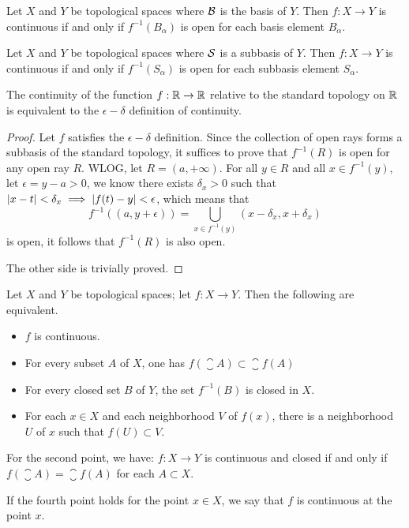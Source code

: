 \documentclass[12pt,a4paper]{article}
\begin{document}
    \begin{thm}
        Let $X$ and $Y$ be topological spaces where $\B$ is the basis of $Y$. Then $f:X\to Y$ is continuous if and only if $f^{-1}(B_\alpha)$ is open for each basis element $B_\alpha$.
    \end{thm}
    \begin{thm}
        Let $X$ and $Y$ be topological spaces where $\S$ is a subbasis of $Y$. Then $f:X\to Y$ is continuous if and only if $f^{-1}(S_\alpha)$ is open for each subbasis element $S_\alpha$.
    \end{thm}
    \hfill

    \begin{eg}
        The continuity of the function $f:\R\to\R$ relative to the standard topology on $\R$ is equivalent to the $\epsilon-\delta$ definition of continuity.
    \end{eg}
    \begin{proof}
        Let $f$ satisfies the $\epsilon-\delta$ definition. Since the collection of open rays forms a subbasis of the standard topology, it suffices to prove that $f^{-1}(R)$ is open for any open ray $R$. WLOG, let $R=(a,+\infty)$. For all $y\in R$ and all $x\in f^{-1}(y)$, let $\epsilon=y-a>0$, we know there exists $\delta_x>0$ such that $\abs{x-t}<\delta_x\implies\abs{f(t)-y}<\epsilon$, which means that
        $$
        f^{-1}((a,y+\epsilon))=\bigcup_{x\in f^{-1}(y)}(x-\delta_x,x+\delta_x)
        $$
        is open, it follows that $f^{-1}(R)$ is also open.

        The other side is trivially proved.
    \end{proof}
    \hfill

    \begin{thm}
        Let $X$ and $Y$ be topological spaces; let $f:X\to Y$. Then the following are equivalent.
        \begin{itemize}
            \item $f$ is continuous.
            \item For every subset $A$ of $X$, one has $f(\closure{A})\subset\closure{f(A)}$
            \item For every closed set $B$ of $Y$, the set $f^{-1}(B)$ is closed in $X$.
            \item For each $x\in X$ and each neighborhood $V$ of $f(x)$, there is a neighborhood $U$ of $x$ such that $f(U)\subset V$.
        \end{itemize}
    \end{thm}
    \begin{remark}
        For the second point, we have: $f:X\to Y$ is continuous and closed if and only if $f(\closure{A})=\closure{f(A)}$ for each $A\subset X$.
    \end{remark}
    \begin{remark}
        If the fourth point holds for the point $x\in X$, we say that $f$ is continuous at the point $x$.
    \end{remark}
    \hfill
    
\end{document}
